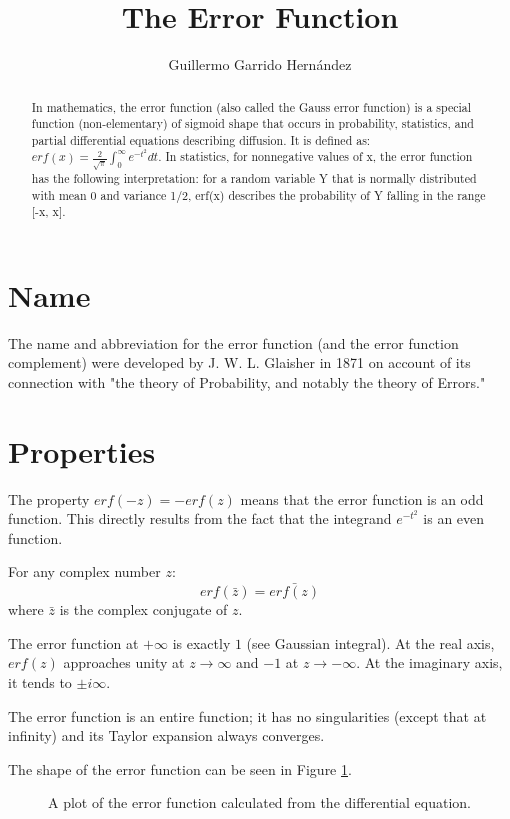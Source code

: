 \documentclass[a4paper]{article}
\title{The Error Function}
\author{Guillermo Garrido Hernández}
\begin{document}
\maketitle

\begin{abstract}
In mathematics, the error function (also called the Gauss error function) is a
special function (non-elementary) of sigmoid shape that occurs in probability,
statistics, and partial differential equations describing diffusion.
It is defined as:
$erf(x) = \frac{2}{\sqrt{\pi}}\int_0^\infty e^{-t^2}dt$.
In statistics, for nonnegative values of x, the error function has the following
interpretation: for a random variable Y that is normally distributed with mean 0
and variance 1/2, erf(x) describes the probability of Y falling in the range
[-x, x].
\end{abstract}

\section{Name}
The name and abbreviation for the error function (and the error function
complement) were developed by J. W. L. Glaisher in 1871 on account of its
connection with "the theory of Probability, and notably the theory of Errors."

\section{Properties}
The property $erf(-z)=−erf(z)$  means that the
error function is an odd function. This directly results from the fact that the
integrand $e^{-t^2}$ is an even function.

For any complex number $z$:
\begin{equation}
  erf(\bar{z})=\bar{erf(z)}
\end{equation}
where $\bar{z}$ is the complex conjugate of $z$.

The error function at $+\infty$ is exactly $1$ (see Gaussian integral). At the
real axis, $erf(z)$ approaches unity at $z\rightarrow\infty$ and
$-1$ at $z\rightarrow -\infty$. At the imaginary axis, it tends to $\pm i\infty$.

The error function is an entire function; it has no singularities (except that at
infinity) and its Taylor expansion always converges.

The shape of the error function can be seen in Figure \ref{fig}.
\begin{figure}
  
  \caption{A plot of the error function calculated from the differential equation.}
  \label{fig}
\end{figure}
\end{document}
